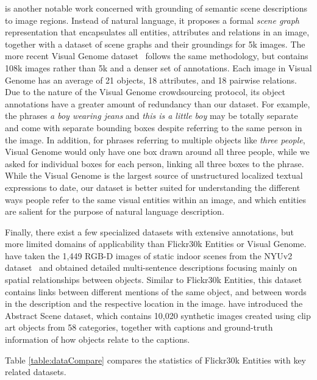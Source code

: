 \documentclass[twocolumn]{svjour3}
\begin{document}
\citet{Johnson2015CVPR} is another notable work concerned with grounding of semantic scene descriptions to image regions. Instead of natural language, it proposes a formal {\em scene graph} representation that encapsulates all entities, attributes and relations in an image, together with a dataset of scene graphs and their groundings for 5k images. The more recent Visual Genome dataset~\citep{krishnavisualgenome} follows the same methodology, but contains 108k images rather than 5k and a denser set of annotations. Each image in Visual Genome has an average of 21 objects, 18 attributes, and 18 pairwise relations. Due to the nature of the Visual Genome crowdsourcing protocol, its object annotations have a greater amount of redundancy than our dataset. For example, the phrases {\em a boy wearing jeans} and {\em this is a little boy} may be totally separate and come with separate bounding boxes despite referring to the same person in the image. In addition, for phrases referring to multiple objects like \emph{three people}, Visual Genome would only have one box drawn around all three people, while we asked for individual boxes for each person, linking all three boxes to the phrase. While the Visual Genome is the largest source of unstructured localized textual expressions to date, our dataset is better suited for understanding the different ways people refer to the same visual entities within an image, and which entities are salient for the purpose of natural language description.

Finally, there exist a few specialized datasets with extensive annotations, but more limited domains of applicability than Flickr30k Entities or Visual Genome. \citet{kong2014you} have taken the 1,449 RGB-D images of static indoor scenes from the NYUv2 dataset~\citep{Silberman:ECCV12} and obtained detailed multi-sentence descriptions focusing mainly on spatial relationships between objects.  Similar to Flickr30k Entities, this dataset contains links between different mentions of the same object, and between words in the description and the respective location in the image. \cite{abstractscene} have introduced the Abstract Scene dataset, which contains 10,020 synthetic images created using clip art objects from 58 categories, together with captions and ground-truth information of how objects relate to the captions. 

Table \ref{table:dataCompare} compares the statistics of Flickr30k Entities with key related datasets.
\end{document}

